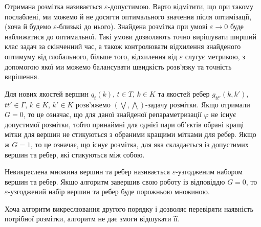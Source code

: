 Отримана розмітка називається $\varepsilon$-допустимою. Варто відмітити, що
при такому послаблені, ми можемо й не досягти оптимального значення після оптимізації,
(хоча й будемо $\varepsilon$-близькі до нього). 
Знайдена розмітка при умові $\varepsilon\rightarrow 0$ буде наближатися до оптимальної.
Такі умови дозволяють точно вирішувати ширший клас задач за скінченний час, а також
контролювати відхилення знайденого оптимуму від глобального, більше того, відхилення від $\varepsilon$
слугує метрикою, з допомогою якої ми можемо балансувати швидкість розв'язку та точність вирішення.


Для нових якостей вершин $q_t(k)$, $t\in T$, $k\in K$ та якостей ребер
$g_{tt'}(k,k')$, $tt'\in\Gamma$, $k\in K$, $k'\in K$ розв'яжемо 
$(\bigvee, \bigwedge)$-задачу розмітки. Якщо отримали $G=0$, то це означає, 
що для даної знайденої репараметризації $\varphi$ не існує допустимої розмітки, тобто
принаймні для однієї пари об'єктів обрані кращі мітки для вершин не стикуються з обраними
кращими мітками для ребер. Якщо ж $G=1$, то це означає, що існує розмітка, для 
яка складається із допустимих вершин та ребер, які стикуються між собою. 

Невикреслена множина 
вершин та ребер називається $\varepsilon$-узгодженим набором вершин та ребер.
Якщо алгоритм завершив свою роботу із відповіддю $G=0$,
то $\varepsilon$-узгоджений набір вершин та ребер буде порожньою множиною.

Хоча алгоритм викреслювання другого порядку і дозволяє перевіряти наявність
потрібної розмітки, алгоритм не дає змоги відшукати її.